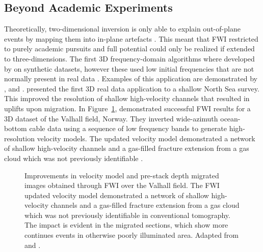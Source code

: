 \subsection{Beyond Academic Experiments}\label{sec:lit_rev_beyond_academic_exp}
Theoretically, two-dimensional inversion is only able to explain out-of-plane events by mapping them into in-plane artefacts \citep{Morgan2009}. This meant that FWI restricted to purely academic pursuits \citep{Sirgue2009} and full potential could only be realized if extended to three-dimensions. The first 3D frequency-domain algorithms where developed by \citet{Warner2007} on synthetic datasets, however these used low initial frequencies that are not normally present in real data \citep{Morgan2013}. Examples of this application are demonstrated by \cite{Sirgue2007}, \cite{Ali2007} and \cite{Operto2007}. \cite{Warner2008c} presented the first 3D real data application to a shallow North Sea survey. This improved the resolution of shallow high-velocity channels that resulted in uplifts upon migration. 
In Figure~\ref{fig:fwi_prestack_improvements}, \citet{Sirgue2009} demonstrated successful FWI results for a 3D dataset of the Valhall field, Norway. They inverted wide-azimuth ocean-bottom cable data using a sequence of low frequency bands to generate high-resolution velocity models. The updated velocity model demonstrated a network of shallow high-velocity channels and a gas-filled fracture extension from a gas cloud which was not previously identifiable \citep{Sirgue2010}.

\begin{figure}[!ht]
	\centering
	\caption[Improvements in velocity model and pre-stack depth migrated images obtained through FWI over the Valhall field.]{Improvements in velocity model and pre-stack depth migrated images obtained through FWI over the Valhall field. The FWI updated velocity model demonstrated a network of shallow high-velocity channels and a gas-filled fracture extension from a gas cloud which was not previously identifiable in conventional tomography. The impact is evident in the migrated sections, which show more continues events in otherwise poorly illuminated area. Adapted from \cite{Sirgue2009} and \cite{Sirgue2010}.}        
	\label{fig:fwi_prestack_improvements}
\end{figure}

